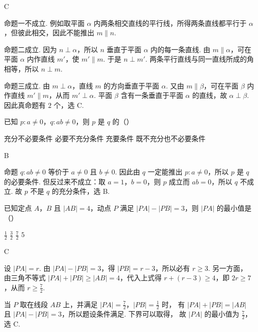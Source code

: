\begin{answer}
C
\end{answer}

\begin{solution}
命题一不成立. 例如取平面 \(\alpha\) 内两条相交直线的平行线，所得两条直线都平行于
\(\alpha\)，但彼此相交，因此不能推出 \(m\parallel n\).

命题二成立. 因为 \(n\perp\alpha\)，所以 \(n\) 垂直于平面 \(\alpha\) 内的每一条直线.
由 \(m\parallel\alpha\)，可在平面 \(\alpha\) 内作直线 \(m'\)，使 \(m'\parallel m\).
于是 \(n\perp m'\). 两条平行直线与同一直线所成的角相等，所以 \(n\perp m\).

命题三成立. 由 \(m\perp\alpha\)，直线 \(m\) 的方向垂直于平面 \(\alpha\). 又由
\(m\parallel\beta\)，可在平面 \(\beta\) 内作直线 \(m'\parallel m\)，从而
\(m'\perp\alpha\). 平面 \(\beta\) 含有一条垂直于平面 \(\alpha\) 的直线，故
\(\alpha\perp\beta\). 因此真命题有 \(2\) 个，选 C.
\end{solution}

\begin{problem}
已知 \(p: a \neq 0\)，\(q: ab \neq 0\)，则 \(p\) 是 \(q\) 的（\quad）

\choices
    {充分不必要条件}
    {必要不充分条件}
    {充要条件}
    {既不充分也不必要条件}
\end{problem}

\begin{answer}
B
\end{answer}

\begin{solution}
命题 \(q:ab\neq0\) 等价于 \(a\neq0\) 且 \(b\neq0\). 因此由 \(q\) 一定能推出
\(p:a\neq0\)，所以 \(p\) 是 \(q\) 的必要条件. 但反过来不成立：取
\(a=1\)，\(b=0\)，则 \(p\) 成立而 \(ab=0\)，所以 \(q\) 不成立. 故 \(p\) 不是
\(q\) 的充分条件，选 B.
\end{solution}

\begin{problem}
已知定点 \(A\)，\(B\) 且 \(|AB| = 4\)，动点 \(P\) 满足 \(|PA| - |PB| = 3\)，则 \(|PA|\) 的最小值是（\quad）

\choices
    {\( \frac{1}{2} \)}
    {\( \frac{3}{2} \)}
    {\( \frac{7}{2} \)}
    {\(5\)}
\end{problem}

\begin{answer}
C
\end{answer}

\begin{solution}
设 \(|PA|=r\). 由 \(|PA|-|PB|=3\)，得 \(|PB|=r-3\)，所以必有
\(r\geqslant3\). 另一方面，由三角不等式
\(|PA|+|PB|\geqslant|AB|=4\)，代入上式得
\(r+(r-3)\geqslant4\)，即 \(2r\geqslant7\)，从而
\(r\geqslant\frac{7}{2}\).

当 \(P\) 取在线段 \(AB\) 上，并满足 \(|PA|=\frac{7}{2}\)，\(|PB|=\frac{1}{2}\) 时，
有 \(|PA|+|PB|=|AB|\) 且 \(|PA|-|PB|=3\)，所以题设条件满足. 下界可以取得，
故 \(|PA|\) 的最小值为 \(\frac{7}{2}\)，选 C.
\end{solution}

